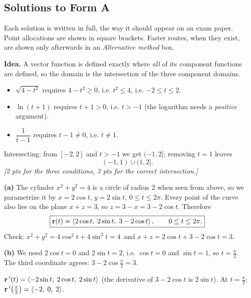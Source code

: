\subsection{Solutions to Form A}\label{sec:sol-a}

Each solution is written in full, the way it should appear on an exam paper.
Point allocations are shown in square brackets. Faster routes, when they
exist, are shown only afterwards in an \emph{Alternative method} box.

\textbf{Idea.} A vector function is defined exactly where \emph{all} of its
component functions are defined, so the domain is the intersection of the three
component domains.
\begin{itemize}
\item $\sqrt{4-t^2}$ requires $4-t^2\ge0$, i.e. $t^2\le4$, i.e. $-2\le t\le2$.
\item $\ln(t+1)$ requires $t+1>0$, i.e. $t>-1$ (the logarithm needs a \emph{positive} argument).
\item $\dfrac{1}{t-1}$ requires $t-1\neq0$, i.e. $t\neq1$.
\end{itemize}
Intersecting: from $[-2,2]$ and $t>-1$ we get $(-1,2]$; removing $t=1$ leaves
\[
  \boxed{(-1,1)\cup(1,2]}.
\]
\textit{[2 pts for the three conditions, 3 pts for the correct intersection.]}

\textbf{(a)} The cylinder $x^2+y^2=4$ is a circle of radius $2$ when seen from above,
so we parametrize it by $x=2\cos t$, $y=2\sin t$, $0\le t\le2\pi$. Every point of the
curve also lies on the plane $x+z=3$, so $z=3-x=3-2\cos t$. Therefore
\[
  \boxed{\mathbf{r}(t)=\left\langle 2\cos t,\;2\sin t,\;3-2\cos t \right\rangle,\qquad0\le t\le2\pi.}
\]
Check: $x^2+y^2=4\cos^2t+4\sin^2t=4$\checkok\ and $x+z=2\cos t+3-2\cos t=3$\checkok.

\textbf{(b)}  We need $2\cos t=0$ and
$2\sin t=2$, i.e. $\cos t=0$ and $\sin t=1$, so $t=\frac\pi2$. The third coordinate
agrees: $3-2\cos\frac\pi2=3$.\checkok

 $\mathbf{r}\,'(t)=\left\langle -2\sin t,\;2\cos t,\;2\sin t \right\rangle$ (the derivative of
$3-2\cos t$ is $2\sin t$). At $t=\frac\pi2$: $\mathbf{r}\,'\!\left(\frac\pi2\right)=\left\langle -2,\;0,\;2 \right\rangle$.


